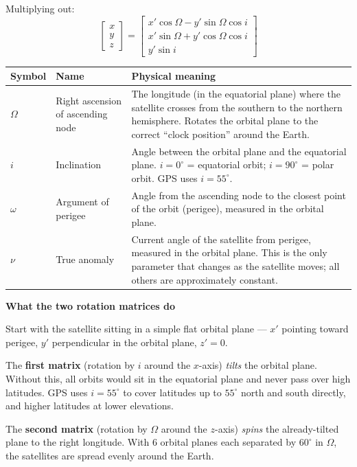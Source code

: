 \documentclass[12pt, a4paper]{article}
\begin{document}
Multiplying out:
\[
  \begin{bmatrix} x \\ y \\ z \end{bmatrix}
  =
  \begin{bmatrix}
    x'\cos\Omega - y'\sin\Omega\cos i \\
    x'\sin\Omega + y'\cos\Omega\cos i \\
    y'\sin i
  \end{bmatrix}
\]

\begin{center}
\begin{tabular}{@{} l p{3.8cm} p{7.2cm} @{}}
  \toprule
  Symbol & Name & Physical meaning \\
  \midrule
  $\Omega$ & Right ascension of ascending node &
    The longitude (in the equatorial plane) where the satellite
    crosses from the southern to the northern hemisphere.
    Rotates the orbital plane to the correct ``clock position''
    around the Earth. \\
  $i$ & Inclination &
    Angle between the orbital plane and the equatorial plane.
    $i=0^\circ$ = equatorial orbit; $i=90^\circ$ = polar orbit.
    GPS uses $i = 55^\circ$. \\
  $\omega$ & Argument of perigee &
    Angle from the ascending node to the closest point of the orbit
    (perigee), measured in the orbital plane. \\
  $\nu$ & True anomaly &
    Current angle of the satellite from perigee, measured in the
    orbital plane.
    This is the only parameter that changes as the satellite moves;
    all others are approximately constant. \\
  \bottomrule
\end{tabular}
\end{center}

\begin{notebox}
  \textbf{What the two rotation matrices do}

  Start with the satellite sitting in a simple flat orbital plane ---
  $x'$ pointing toward perigee, $y'$ perpendicular in the orbital
  plane, $z' = 0$.

  The \textbf{first matrix} (rotation by $i$ around the $x$-axis)
  \emph{tilts} the orbital plane.
  Without this, all orbits would sit in the equatorial plane and
  never pass over high latitudes.
  GPS uses $i = 55^\circ$ to cover latitudes up to $55^\circ$ north
  and south directly, and higher latitudes at lower elevations.

  The \textbf{second matrix} (rotation by $\Omega$ around the
  $z$-axis) \emph{spins} the already-tilted plane to the right
  longitude.
  With 6 orbital planes each separated by $60^\circ$ in $\Omega$,
  the satellites are spread evenly around the Earth.
\end{notebox}
\end{document}

